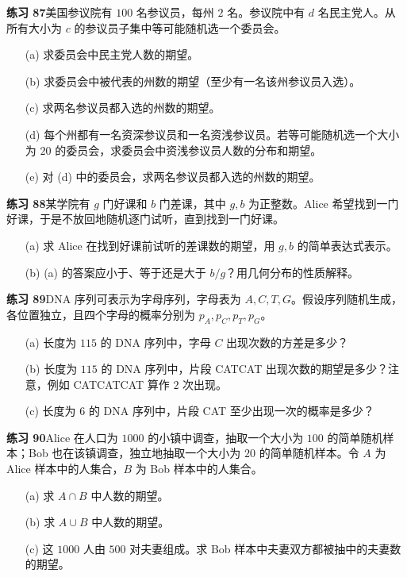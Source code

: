 \documentclass[UTF8,12pt,a4paper,fontset=fandol]{ctexart}
\begin{document}
\noindent\textbf{练习 87}\quad 美国参议院有 $100$ 名参议员，每州 $2$ 名。参议院中有 $d$ 名民主党人。从所有大小为 $c$ 的参议员子集中等可能随机选一个委员会。
\begin{enumerate}
  \item[(a)] 求委员会中民主党人数的期望。
  \item[(b)] 求委员会中被代表的州数的期望（至少有一名该州参议员入选）。
  \item[(c)] 求两名参议员都入选的州数的期望。
  \item[(d)] 每个州都有一名资深参议员和一名资浅参议员。若等可能随机选一个大小为 $20$ 的委员会，求委员会中资浅参议员人数的分布和期望。
  \item[(e)] 对 (d) 中的委员会，求两名参议员都入选的州数的期望。
\end{enumerate}

\noindent\textbf{练习 88}\quad 某学院有 $g$ 门好课和 $b$ 门差课，其中 $g,b$ 为正整数。Alice 希望找到一门好课，于是不放回地随机逐门试听，直到找到一门好课。
\begin{enumerate}
  \item[(a)] 求 Alice 在找到好课前试听的差课数的期望，用 $g,b$ 的简单表达式表示。
  \item[(b)] (a) 的答案应小于、等于还是大于 $b/g$？用几何分布的性质解释。
\end{enumerate}

\noindent\textbf{练习 89}\quad DNA 序列可表示为字母序列，字母表为 $A,C,T,G$。假设序列随机生成，各位置独立，且四个字母的概率分别为 $p_A,p_C,p_T,p_G$。
\begin{enumerate}
  \item[(a)] 长度为 $115$ 的 DNA 序列中，字母 $C$ 出现次数的方差是多少？
  \item[(b)] 长度为 $115$ 的 DNA 序列中，片段 CATCAT 出现次数的期望是多少？注意，例如 CATCATCAT 算作 $2$ 次出现。
  \item[(c)] 长度为 $6$ 的 DNA 序列中，片段 CAT 至少出现一次的概率是多少？
\end{enumerate}

\noindent\textbf{练习 90}\quad Alice 在人口为 $1000$ 的小镇中调查，抽取一个大小为 $100$ 的简单随机样本；Bob 也在该镇调查，独立地抽取一个大小为 $20$ 的简单随机样本。令 $A$ 为 Alice 样本中的人集合，$B$ 为 Bob 样本中的人集合。
\begin{enumerate}
  \item[(a)] 求 $A\cap B$ 中人数的期望。
  \item[(b)] 求 $A\cup B$ 中人数的期望。
  \item[(c)] 这 $1000$ 人由 $500$ 对夫妻组成。求 Bob 样本中夫妻双方都被抽中的夫妻数的期望。
\end{enumerate}
\end{document}
